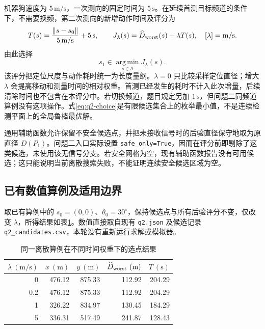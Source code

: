 机器狗速度为 $5\,\mathrm{m/s}$，一次测向的固定时间为 $5\,\mathrm s$。在延续首测目标频道的条件下，不需要换频，第二次测向的新增动作时间及评分为
\begin{equation}
 T(s)=\frac{\|s-s_0\|}{5\,\mathrm{m/s}}+5\,\mathrm s,
 \qquad
 J_\lambda(s)=\widehat D_{\rm worst}(s)+\lambda T(s),
 \quad [\lambda]=\mathrm{m/s}.
 \label{eq:q2-objective}
\end{equation}
由此选择
\begin{equation}
 s_1\in\operatorname*{arg\,min}_{s\in\mathcal S}J_\lambda(s).
 \label{eq:q2-choice}
\end{equation}
该评分把定位尺度与动作耗时统一为长度量纲。$\lambda=0$ 只比较采样定位直径；增大 $\lambda$ 会提高移动和测量时间的相对权重。首测已经发生的耗时不计入此次增量，后续清除时间也不包含在本评分中。若切换频道，题目规定另加 $1\,\mathrm s$，但问题二同频道算例没有这项操作。式\eqref{eq:q2-choice}是有限候选集合上的枚举最小值，不是连续检测平面上的全局鲁棒最优解。

通用辅助函数允许保留不安全候选点，并把未接收信号时的后验直径保守地取为原直径 $D(P_1)$。问题二入口实际设置 \texttt{safe\_only=True}，因而在评分前即剔除了这类候选，未使用该无信号分支。若安全网格为空，现有辅助函数报告没有可用候选；这只能说明当前离散搜索失败，不能证明连续安全候选区域为空。

\subsection{已有数值算例及适用边界}
取已有算例中的 $s_0=(0,0)$、$\theta_0=30^\circ$，保持候选点与所有后验评分不变，仅改变 $\lambda$，所得结果如表\ref{tab:q2-results}。数值直接取自现有 \texttt{q2.json} 及候选记录 \texttt{q2\_candidates.csv}，本轮没有重新运行求解或模拟器。

\begin{table}[htbp]
 \centering
 \caption{同一离散算例在不同时间权重下的选点结果}
 \label{tab:q2-results}
 \begin{tabular}{@{}rrrrr@{}}
  \toprule
  $\lambda\ (\mathrm{m/s})$ & $x\ (\mathrm m)$ & $y\ (\mathrm m)$ & $\widehat D_{\rm worst}\ (\mathrm m)$ & $T\ (\mathrm s)$ \\
  \midrule
  0   & 476.12 & 875.33 & 112.92 & 204.29 \\
  0.2 & 476.12 & 875.33 & 112.92 & 204.29 \\
  1   & 326.22 & 834.97 & 130.45 & 184.29 \\
  5   & 336.31 & 517.49 & 241.87 & 128.43 \\
  \bottomrule
 \end{tabular}
\end{table}

